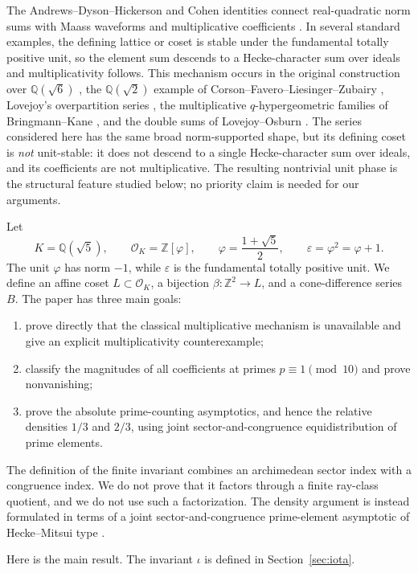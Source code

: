 \documentclass[12pt]{amsart}
\theoremstyle{definition}
\theoremstyle{remark}
\newcommand{\ZZ}{\mathbb{Z}}
\newcommand{\QQ}{\mathbb{Q}}
\newcommand{\OK}{\mathcal{O}_K}
\newcommand{\eps}{\varepsilon}
\newcommand{\ph}{\varphi}
\begin{document}
The Andrews--Dyson--Hickerson and Cohen identities connect
real-quadratic norm sums with Maass waveforms and multiplicative
coefficients \cite{jADH88,jCo88,jCo95}.  In several standard examples,
the defining lattice or coset is stable under the fundamental totally
positive unit, so the element sum descends to a Hecke-character sum
over ideals and multiplicativity follows.  This mechanism occurs in
the original construction over $\QQ(\sqrt6)$
\cite{jADH88,jCo88}, the $\QQ(\sqrt2)$ example of
Corson--Favero--Liesinger--Zubairy \cite{jCFLZ04}, Lovejoy's
overpartition series \cite{jLo04}, the multiplicative
$q$-hypergeometric families of Bringmann--Kane \cite{jBrKa11}, and
the double sums of Lovejoy--Osburn \cite{jLO13,jLoOs15}.  The series
considered here has the same broad norm-supported shape, but its
defining coset is \emph{not} unit-stable: it does not descend to a
single Hecke-character sum over ideals, and its coefficients are not
multiplicative.  The resulting nontrivial unit phase is the structural
feature studied below; no priority claim is needed for our arguments.

Let
\[
  K=\QQ(\sqrt5),
  \qquad
  \OK=\ZZ[\ph],
  \qquad
  \ph=\frac{1+\sqrt5}{2},
  \qquad
  \eps=\ph^2=\ph+1.
\]
The unit $\ph$ has norm $-1$, while $\eps$ is the fundamental totally
positive unit.  We define an affine coset $L\subset\OK$, a bijection
$\beta:\ZZ^2\to L$, and a cone-difference series $B$.  The paper has
three main goals:
\begin{enumerate}
\item prove directly that the classical multiplicative mechanism is
unavailable and give an explicit multiplicativity counterexample;
\item classify the magnitudes of all coefficients at primes
$p\equiv1\pmod{10}$ and prove nonvanishing;
\item prove the absolute prime-counting asymptotics, and hence the
relative densities $1/3$ and $2/3$, using joint
sector-and-congruence equidistribution of prime elements.
\end{enumerate}

The definition of the finite invariant combines an archimedean sector
index with a congruence index.  We do not prove that it factors through
a finite ray-class quotient, and we do not use such a factorization.
The density argument is instead formulated in terms of a joint
sector-and-congruence prime-element asymptotic of Hecke--Mitsui type
\cite{jHe20,jMi56,oKai22}.

Here is the main result.  The invariant $\iota$ is defined in
Section~\ref{sec:iota}.
\end{document}
